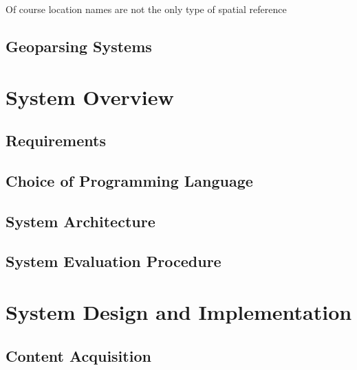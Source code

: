 \documentclass[12pt, a4paper]{report}
\begin{document}
Of course location names are not the only type of spatial reference


\section{Geoparsing Systems}


\chapter{System Overview}

\section{Requirements}

\section{Choice of Programming Language}

\section{System Architecture}

\section{System Evaluation Procedure}


\chapter{System Design and Implementation}

\section{Content Acquisition}
\end{document}

